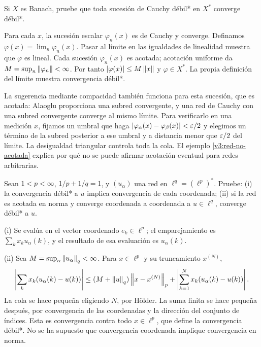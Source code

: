 \begin{ejercicio}\label{ej:v3-l16-3}
Si $X$ es Banach, pruebe que toda sucesión de Cauchy débil* en $X^*$ converge débil*.
\end{ejercicio}
\begin{solucion}
Para cada $x$, la sucesión escalar $\varphi_n(x)$ es de Cauchy y converge. Definamos $\varphi(x)=\lim_n\varphi_n(x)$. Pasar al límite en las igualdades de linealidad muestra que $\varphi$ es lineal. Cada sucesión $\varphi_n(x)$ es acotada; acotación uniforme da $M=\sup_n\left\lVert\varphi_n\right\rVert<\infty$. Por tanto $|\varphi(x)|\leq M\left\lVert x\right\rVert$ y $\varphi\in X^*$. La propia definición del límite muestra convergencia débil*.

La sugerencia mediante compacidad también funciona para esta sucesión, que es acotada: Alaoglu proporciona una subred convergente, y una red de Cauchy con una subred convergente converge al mismo límite. Para verificarlo en una medición $x$, fijamos un umbral que haga $|\varphi_\alpha(x)-\varphi_\beta(x)|<\varepsilon/2$ y elegimos un término de la subred posterior a ese umbral y a distancia menor que $\varepsilon/2$ del límite. La desigualdad triangular controla toda la cola. El ejemplo \ref{v3:red-no-acotada} explica por qué no se puede afirmar acotación eventual para redes arbitrarias.
\end{solucion}

\begin{ejercicio}\label{ej:v3-l16-4}
Sean $1<p<\infty$, $1/p+1/q=1$, y $(u_\alpha)$ una red en $\ell^q=(\ell^p)^*$. Pruebe: (i) la convergencia débil* a $u$ implica convergencia de cada coordenada; (ii) si la red es acotada en norma y converge coordenada a coordenada a $u\in\ell^q$, converge débil* a $u$.
\end{ejercicio}
\begin{solucion}
(i) Se evalúa en el vector coordenado $e_k\in\ell^p$; el emparejamiento es $\sum_kx_ku_\alpha(k)$, y el resultado de esa evaluación es $u_\alpha(k)$.

(ii) Sea $M=\sup_\alpha\left\lVert u_\alpha\right\rVert_q<\infty$. Para $x\in\ell^p$ y su truncamiento $x^{(N)}$,
\[
 \left|\sum_kx_k(u_\alpha(k)-u(k))\right|
 \leq(M+\left\lVert u\right\rVert_q)\left\lVert x-x^{(N)}\right\rVert_p
       +\left|\sum_{k=1}^Nx_k(u_\alpha(k)-u(k))\right|.
\]
La cola se hace pequeña eligiendo $N$, por Hölder. La suma finita se hace pequeña después, por convergencia de las coordenadas y la dirección del conjunto de índices. Esta es convergencia contra todo $x\in\ell^p$, que define la convergencia débil*. No se ha supuesto que convergencia coordenada implique convergencia en norma.
\end{solucion}

